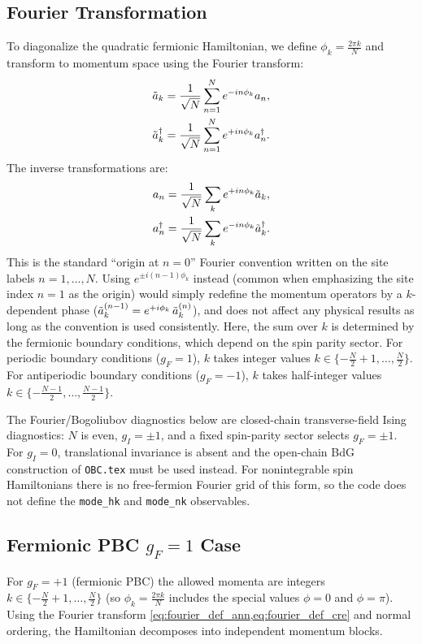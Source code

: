 \documentclass[aps,prx,twocolumn,superscriptaddress,nofootinbib,nolongbibliography,nobalancelastpage,10pt,floatfix]{revtex4-2}
\begin{document}
\subsection{Fourier Transformation}
To diagonalize the quadratic fermionic Hamiltonian, we define $\phi_k = \frac{2\pi k}{N}$ and transform to momentum space using the Fourier transform:
\begin{align}
    \tilde{a}_k      &= \frac{1}{\sqrt{N}} \sum_{n=1}^N e^{-i n\phi_{k}} a_n,\\
    \tilde{a}_k^\dag &= \frac{1}{\sqrt{N}} \sum_{n=1}^N e^{+i n\phi_{k}} a_n^\dag.
\end{align}
The inverse transformations are:
\begin{align}
    a_n      &= \frac{1}{\sqrt{N}} \sum_{k} e^{+i n\phi_k} \tilde{a}_k, \label{eq:fourier_def_ann}\\
    a_n^\dag &= \frac{1}{\sqrt{N}} \sum_{k} e^{-i n\phi_k} \tilde{a}_k^\dag. \label{eq:fourier_def_cre}
\end{align}
This is the standard ``origin at $n=0$'' Fourier convention written on the site labels $n=1,\dots,N$.
Using $e^{\pm i(n-1)\phi_k}$ instead (common when emphasizing the site index $n=1$ as the origin)
would simply redefine the momentum operators by a $k$-dependent phase
($\tilde{a}_k^{(n-1)} = e^{+i\phi_k}\,\tilde{a}_k^{(n)}$), and does not affect any physical results as long as the convention
is used consistently.
Here, the sum over $k$ is determined by the fermionic boundary conditions, which depend on the spin parity sector. For periodic boundary conditions ($g_F = 1$), $k$ takes integer values $k \in \{-\frac{N}{2}+1, \dots, \frac{N}{2}\}$. For antiperiodic boundary conditions ($g_F = -1$), $k$ takes half-integer values $k \in \{-\frac{N-1}{2}, \dots, \frac{N-1}{2}\}$.

The Fourier/Bogoliubov diagnostics below are closed-chain transverse-field Ising diagnostics: $N$ is even, $g_I=\pm1$, and a fixed spin-parity sector selects $g_F=\pm1$.  For $g_I=0$, translational invariance is absent and the open-chain BdG construction of \texttt{OBC.tex} must be used instead.  For nonintegrable spin Hamiltonians there is no free-fermion Fourier grid of this form, so the code does not define the \texttt{mode\_hk} and \texttt{mode\_nk} observables.


\subsection{Fermionic PBC $g_F = 1$ Case}

For $g_F=+1$ (fermionic PBC) the allowed momenta are integers
$k\in\{-\frac{N}{2}+1,\dots,\frac{N}{2}\}$ (so $\phi_k=\frac{2\pi k}{N}$ includes the special values $\phi=0$ and $\phi=\pi$).
Using the Fourier transform \cref{eq:fourier_def_ann,eq:fourier_def_cre} and normal ordering, the Hamiltonian decomposes into independent momentum blocks.
\end{document}
